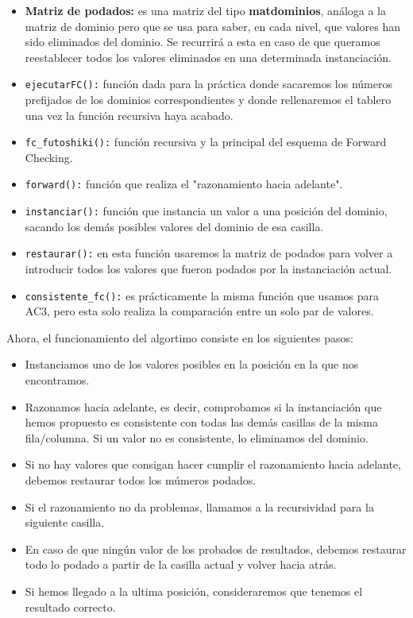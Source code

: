 \documentclass[12pt]{article}
\begin{document}
\begin{itemize}
    \item \textbf{Matriz de podados:} es una matriz del tipo \textbf{matdominios}, análoga a la matriz de dominio pero que se usa
        para saber, en cada nivel, que valores han sido eliminados del dominio. Se recurrirá a esta en caso de que queramos reestablecer 
        todos los valores eliminados en una determinada instanciación.
    \item \verb|ejecutarFC():| función dada para la práctica donde sacaremos los números prefijados de los dominios correspondientes y 
        donde rellenaremos el tablero una vez la función recursiva haya acabado.
    \item \verb|fc_futoshiki():| función recursiva y la principal del esquema de Forward Checking. 
    \item \verb|forward():| función que realiza el "razonamiento hacia adelante". 
    \item \verb|instanciar():| función que instancia un valor a una posición del dominio, sacando los demás posibles
        valores del dominio de esa casilla.
    \item \verb|restaurar():| en esta función usaremos la matriz de podados para volver a introducir todos los
        valores que fueron podados por la instanciación actual.
    \item \verb|consistente_fc():| es prácticamente la misma función que usamos para AC3, pero esta solo realiza la comparación
        entre un solo par de valores.     
\end{itemize}

Ahora, el funcionamiento del algortimo consiste en los siguientes pasos: 
\begin{itemize}
    
    \item Instanciamos uno de los valores posibles en la posición en la que nos encontramos.
    \item Razonamos hacia adelante, es decir, comprobamos si la instanciación que hemos propuesto es consistente
        con todas las demás casillas de la misma fila/columna. Si un valor no es consistente, lo eliminamos del dominio.
    \item Si no hay valores que consigan hacer cumplir el razonamiento hacia adelante, debemos restaurar todos los múmeros podados.
    \item Si el razonamiento no da problemas, llamamos a la recursividad para la siguiente casilla.
    \item En caso de que ningún valor de los probados de resultados, debemos restaurar todo lo podado a partir de la casilla actual y 
        volver hacia atrás.
    \item Si hemos llegado a la ultima posición, consideraremos que tenemos el resultado correcto.
    

\end{itemize}
\end{document}
